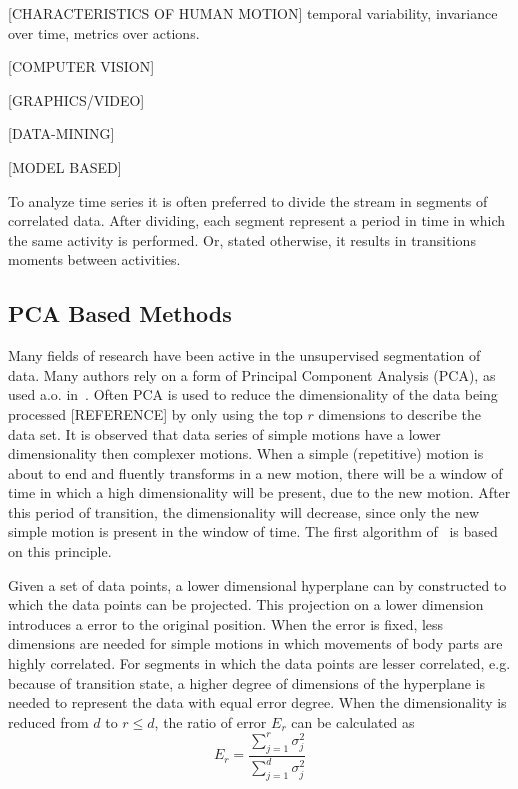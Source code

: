 [CHARACTERISTICS OF HUMAN MOTION]
temporal variability, invariance over time, metrics over actions.

[COMPUTER VISION]

[GRAPHICS/VIDEO]

[DATA-MINING]

[MODEL BASED]

To analyze time series it is often preferred to divide the stream in segments of correlated data.
After dividing, each segment represent a period in time in which the same activity is performed.
Or, stated otherwise, it results in transitions moments between activities.

\subsection{PCA Based Methods}

Many fields of research have been active in the unsupervised segmentation of data.
Many authors rely on a form of Principal Component Analysis (PCA), as used a.o. in~\cite{barbivc2004segmenting}.
Often PCA is used to reduce the dimensionality of the data being processed [REFERENCE] by only using the top $r$ dimensions to describe the data set.
It is observed that data series of simple motions have a lower dimensionality then complexer motions.
When a simple (repetitive) motion is about to end and fluently transforms in a new motion, there will be a window of time in which a high dimensionality will be present, due to the new motion.
After this period of transition, the dimensionality will decrease, since only the new simple motion is present in the window of time.
The first algorithm of~\cite{barbivc2004segmenting} is based on this principle.

Given a set of data points, a lower dimensional hyperplane can by constructed to which the data points can be projected.
This projection on a lower dimension introduces a error to the original position.
When the error is fixed, less dimensions are needed for simple motions in which movements of body parts are highly correlated.
For segments in which the data points are lesser correlated, e.g. because of transition state, a higher degree of dimensions of the hyperplane is needed to represent the data with equal error degree.
When the dimensionality is reduced from $d$ to $r \le d$, the ratio of error $E_r$ can be calculated as
\begin{equation}
	E_r = \frac{\sum_{j=1}^{r} \sigma_j^2}{\sum_{j=1}^{d} \sigma_j^2}
\end{equation}

